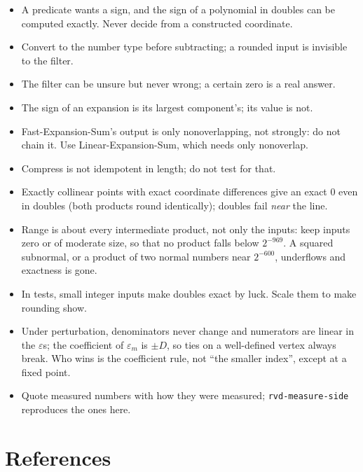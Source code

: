 \documentclass[11pt,a4paper]{article}
\newcommand{\code}[1]{\texttt{#1}}
\theoremstyle{definition}
\theoremstyle{remark}
\begin{document}
\begin{itemize}
  \item A predicate wants a sign, and the sign of a polynomial in doubles can be computed exactly.
    Never decide from a constructed coordinate.
  \item Convert to the number type before subtracting; a rounded input is invisible to the filter.
  \item The filter can be unsure but never wrong; a certain zero is a real answer.
  \item The sign of an expansion is its largest component's; its value is not.
  \item Fast-Expansion-Sum's output is only nonoverlapping, not strongly: do not chain it. Use
    Linear-Expansion-Sum, which needs only nonoverlap.
  \item Compress is not idempotent in length; do not test for that.
  \item Exactly collinear points with exact coordinate differences give an exact 0 even in doubles
    (both products round identically); doubles fail \emph{near} the line.
  \item Range is about every intermediate product, not only the inputs: keep inputs zero or of
    moderate size, so that no product falls below $2^{-969}$. A squared subnormal, or a product
    of two normal numbers near $2^{-600}$, underflows and exactness is gone.
  \item In tests, small integer inputs make doubles exact by luck. Scale them to make rounding
    show.
  \item Under perturbation, denominators never change and numerators are linear in the
    $\varepsilon$s; the coefficient of $\varepsilon_m$ is $\pm D$, so ties on a well-defined vertex
    always break. Who wins is the coefficient rule, not ``the smaller index'', except at a fixed
    point.
  \item Quote measured numbers with how they were measured; \code{rvd-measure-side} reproduces
    the ones here.
\end{itemize}

\section*{References}
\end{document}
